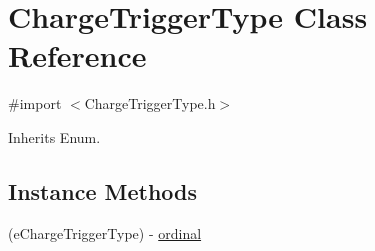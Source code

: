 \hypertarget{interface_charge_trigger_type}{}\section{Charge\+Trigger\+Type Class Reference}
\label{interface_charge_trigger_type}


{\ttfamily \#import $<$Charge\+Trigger\+Type.\+h$>$}



Inherits Enum.

\subsection*{Instance Methods}
\begin{DoxyCompactItemize}
\item 
(e\+Charge\+Trigger\+Type) -\/ \hyperlink{interface_charge_trigger_type_ac0375d3aba8c2f09763407653cca15b9}{ordinal}
\end{DoxyCompactItemize}

